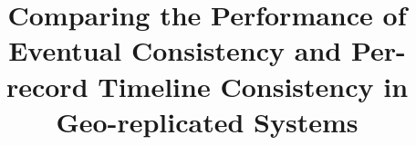 \documentclass[doublespacing]{bmcart}
\begin{document}
\begin{frontmatter}

\begin{fmbox}


\title{Comparing the Performance of Eventual Consistency and Per-record
Timeline Consistency in Geo-replicated Systems}


\author[
   addressref={aff1},                   %
   corref={aff1},                       %
   email={mdediana@ime.usp.br}   %
]{ }
\author[
   addressref={aff1},
   email={gerosa@ime.usp.br}
]{ }


\address[id=aff1]{%
  , %
  ,                     %
  ,                              %
}


\end{fmbox}
\end{frontmatter}
\end{document}
